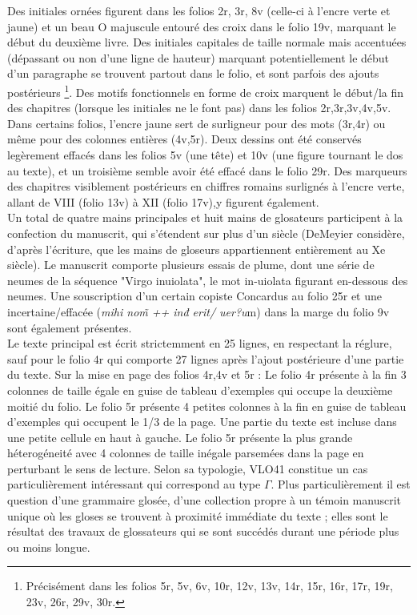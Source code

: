 \documentclass[a4paper, twoside, 12pt]{book}
\begin{document}
Des initiales ornées figurent dans les folios 2r, 3r, 8v (celle-ci à l'encre verte et jaune) et un beau \og{} O \fg{} majuscule entouré des croix dans le folio 19v, marquant le début du deuxième livre. Des initiales capitales de taille normale mais accentuées (dépassant ou non d'une ligne de hauteur) marquant potentiellement le début d'un paragraphe se trouvent partout dans le folio, et sont parfois des ajouts postérieurs \footnote{ Précisément dans les folios 5r, 5v, 6v, 10r, 12v, 13v, 14r, 15r, 16r, 17r, 19r, 23v, 26r, 29v, 30r.}. Des motifs fonctionnels en forme de croix marquent le début/la fin des chapitres (lorsque les initiales ne le font pas) dans les folios 2r,3r,3v,4v,5v. Dans certains folios, l'encre jaune sert de surligneur pour des mots (3r,4r) ou même pour des colonnes entières (4v,5r). Deux dessins ont été conservés legèrement effacés dans les folios 5v (une tête) et 10v (une figure tournant le dos au texte), et un troisième semble avoir été effacé dans le folio 29r. Des marqueurs des chapitres visiblement postérieurs en chiffres romains surlignés à l'encre verte, allant de VIII (folio 13v) à XII (folio 17v),y figurent également.\\

Un total de quatre mains principales et huit mains de glosateurs participent à la confection du manuscrit, qui s'étendent sur plus d'un siècle (DeMeyier considère, d'après l'écriture, que les mains de gloseurs appartiennent entièrement au Xe siècle). Le manuscrit comporte plusieurs essais de plume, dont une série de neumes de la séquence "Virgo inuiolata", le mot in-uiolata figurant en-dessous des neumes. Une souscription d'un certain copiste Concardus au folio 25r et une incertaine/effacée (\textit{mihi nom̃ ++ inđ erit/ uer?u}m) dans la marge du folio 9v sont également présentes. \\

Le texte principal est écrit strictemment en 25 lignes, en respectant la réglure, sauf pour le folio 4r qui comporte 27  lignes après l'ajout postérieure d'une partie du texte. Sur la mise en page des folios 4r,4v et 5r : Le folio 4r présente à la fin 3 colonnes de taille égale en guise de tableau d'exemples qui  occupe la deuxième moitié du folio. Le folio 5r présente 4 petites colonnes à la fin en guise de tableau d'exemples qui occupent  le 1/3 de la page. Une partie du texte est incluse dans une petite cellule en haut à gauche. Le folio 5r présente la  plus grande héterogéneité avec 4 colonnes de taille inégale parsemées dans la page en perturbant le sens de lecture. Selon sa typologie, VLO41 constitue un cas particulièrement intéressant qui correspond au type $\Gamma$. Plus particulièrement il est question d'une grammaire glosée, d'une collection propre à un témoin manuscrit unique où les gloses se trouvent à proximité immédiate du texte ; elles sont le résultat des travaux de glossateurs qui se sont succédés durant une période plus ou moins longue. \\
\end{document}
